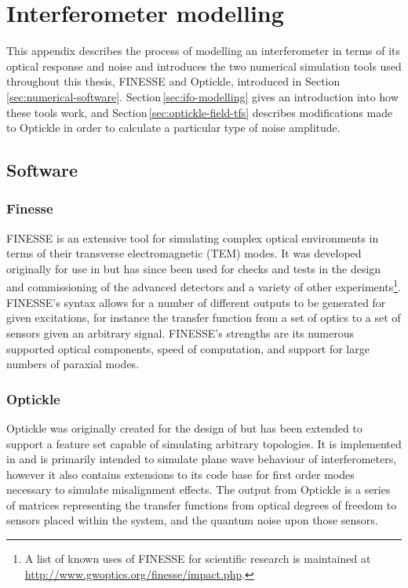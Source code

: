 \chapter{\label{a:simulation-tools}Interferometer modelling}
This appendix describes the process of modelling an interferometer in terms of its optical response and noise and introduces the two numerical simulation tools used throughout this thesis, \gls{FINESSE} and Optickle, introduced in Section\,\ref{sec:numerical-software}. Section\,\ref{sec:ifo-modelling} gives an introduction into how these tools work, and Section\,\ref{sec:optickle-field-tfs} describes modifications made to Optickle in order to calculate a particular type of noise amplitude.

\section{\label{sec:numerical-software}Software}
\subsection{\label{sec:finesse-sim}Finesse}
\gls{FINESSE} is an extensive tool for simulating complex optical environments in terms of their transverse electromagnetic (\gls{TEM}) modes. It was developed originally for use in \GEO{} \cite{Freise2004} but has since been used for checks and tests in the design and commissioning of the advanced detectors \cite{Mueller2015, Kumeta2015} and a variety of other experiments\footnote{A list of known uses of \gls{FINESSE} for scientific research is maintained at \url{http://www.gwoptics.org/finesse/impact.php}.}. \gls{FINESSE}'s syntax allows for a number of different outputs to be generated for given excitations, for instance the transfer function from a set of optics to a set of sensors given an arbitrary signal. \gls{FINESSE}'s strengths are its numerous supported optical components, speed of computation, and support for large numbers of paraxial modes.

\subsection{\label{sec:optickle-sim}Optickle}
Optickle was originally created for the design of \ALIGO{} but has been extended to support a feature set capable of simulating arbitrary topologies. It is implemented in \MATLAB{} and is primarily intended to simulate plane wave behaviour of interferometers, however it also contains extensions to its code base for first order modes necessary to simulate misalignment effects. The output from Optickle is a series of matrices representing the transfer functions from optical degrees of freedom to sensors placed within the system, and the quantum noise upon those sensors.

